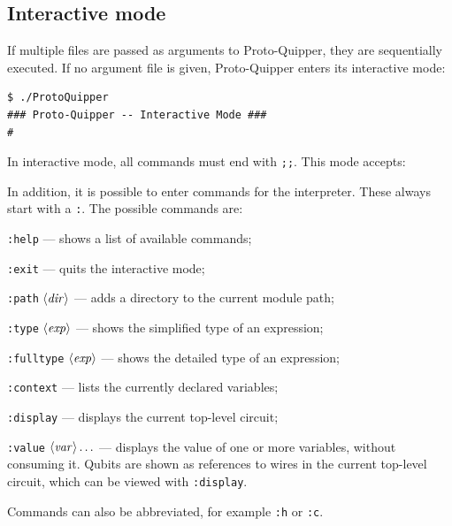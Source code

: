 \subsection{Interactive mode}

If multiple files are passed as arguments to Proto-Quipper, they 
are sequentially executed. If no argument file is given, Proto-Quipper 
enters its interactive mode:
\begin{verbatim}
$ ./ProtoQuipper
### Proto-Quipper -- Interactive Mode ###
# 
\end{verbatim}
In interactive mode, all commands must end with \verb#;;#. This mode accepts:
In addition, it is possible to enter commands for the
interpreter. These always start with a \verb#:#. The possible commands are:
\begin{compactitemize}
  \item \verb#:help# --- shows a list of available commands;
  \item \verb#:exit# --- quits the interactive mode;
  \item \verb#:path# $\langle{\it dir}\rangle$ --- adds a directory to the
    current module path;
  \item \verb#:type# $\langle{\it exp}\rangle$ --- shows the simplified type of an expression;
  \item \verb#:fulltype# $\langle{\it exp}\rangle$ --- shows the detailed type of an expression;
  \item \verb#:context# --- lists the currently declared variables;
  \item \verb#:display# --- displays the current top-level circuit;
  \item \verb#:value# $\langle{\it var}\rangle\ldots$ --- displays the value of
    one or more variables, without consuming it. Qubits are shown as
    references to wires in the current top-level circuit, which can be viewed with \verb#:display#.
\end{compactitemize}
Commands can also be abbreviated, for example \verb#:h# or \verb#:c#.

